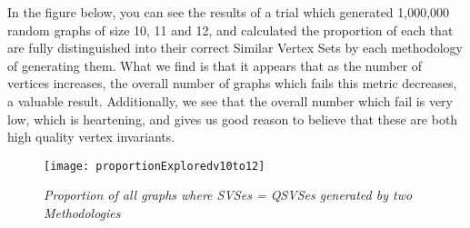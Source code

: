 In the figure below, you can see the results of a trial which generated 1,000,000 random graphs of size 10, 11 and 12, and calculated the proportion of each that are fully distinguished into their correct Similar Vertex Sets by each methodology of generating them.
What we find is that it appears that as the number of vertices increases, the overall number of graphs which fails this metric decreases, a valuable result.
Additionally, we see that the overall number which fail is very low, which is heartening, and gives us good reason to believe that these are both high quality vertex invariants.

\begin{figure}[h]
\label{fig:proportionQSVSeqSVS}
\caption{\emph{Proportion of all graphs where SVSes = QSVSes generated by two Methodologies}}
\centering
\texttt{[image: proportionExploredv10to12]}
\end{figure}



